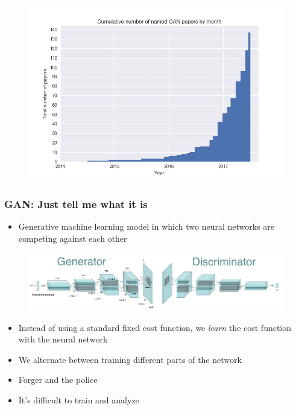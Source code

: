 \documentclass{Bredelebeamer}
\begin{document}

\begin{frame}
\begin{figure}[h!]
	\centering
	\includegraphics[width=\textwidth]{gan_timeline.jpg}
\end{figure}

\end{frame}


\begin{frame}
	\frametitle{GAN: Just tell me what it is}
	\begin{itemize}
		\item Generative machine learning model in which two neural networks are competing against each other
	\end{itemize}
\begin{figure}[h!]
	\centering
	\includegraphics[width=\textwidth]{dcgan_both.png}
\end{figure}
	\begin{itemize}
		\item Instead of using a standard fixed cost function, we \textit{learn} the cost function with the neural network
		\item We alternate between training different parts of the network
		\item Forger and the police
		\item It's difficult to train and analyze
	\end{itemize}
\end{frame}
\end{document}
